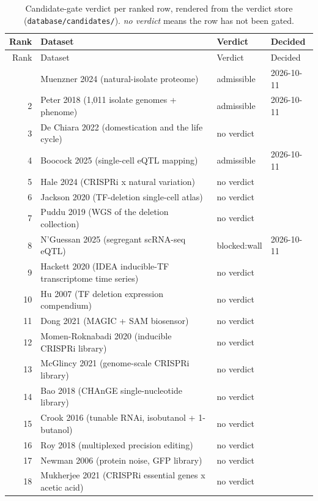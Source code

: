 \begingroup
\footnotesize
\begin{longtable}{@{}r L{88mm} L{40mm} L{24mm}@{}}
\caption[]{Candidate-gate verdict per ranked row, rendered from the verdict store
(\texttt{database/candidates/}). \emph{no verdict} means the row has not been gated.}
\label{tab:verdicts}\\
\toprule
Rank & Dataset & Verdict & Decided \\
\midrule
\endfirsthead
\toprule
Rank & Dataset & Verdict & Decided \\
\midrule
\endhead
\bottomrule
{} & Muenzner 2024 (natural-isolate proteome) & admissible & 2026-10-11 \\
2 & Peter 2018 (1,011 isolate genomes + phenome) & admissible & 2026-10-11 \\
3 & De Chiara 2022 (domestication and the life cycle) & no verdict &  \\
4 & Boocock 2025 (single-cell eQTL mapping) & admissible & 2026-10-11 \\
5 & Hale 2024 (CRISPRi x natural variation) & no verdict &  \\
6 & Jackson 2020 (TF-deletion single-cell atlas) & no verdict &  \\
7 & Puddu 2019 (WGS of the deletion collection) & no verdict &  \\
8 & N'Guessan 2025 (segregant scRNA-seq eQTL) & blocked:wall & 2026-10-11 \\
9 & Hackett 2020 (IDEA inducible-TF transcriptome time series) & no verdict &  \\
10 & Hu 2007 (TF deletion expression compendium) & no verdict &  \\
11 & Dong 2021 (MAGIC + SAM biosensor) & no verdict &  \\
12 & Momen-Roknabadi 2020 (inducible CRISPRi library) & no verdict &  \\
13 & McGlincy 2021 (genome-scale CRISPRi library) & no verdict &  \\
14 & Bao 2018 (CHAnGE single-nucleotide library) & no verdict &  \\
15 & Crook 2016 (tunable RNAi, isobutanol + 1-butanol) & no verdict &  \\
16 & Roy 2018 (multiplexed precision editing) & no verdict &  \\
17 & Newman 2006 (protein noise, GFP library) & no verdict &  \\
18 & Mukherjee 2021 (CRISPRi essential genes x acetic acid) & no verdict &  \\

\end{longtable}

